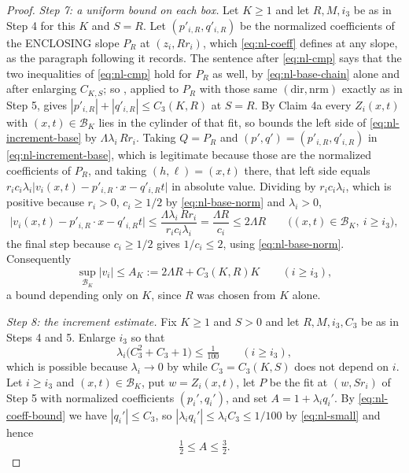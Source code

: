 \begin{proof}
\emph{Step 7: a uniform bound on each box.}
Let $K\ge1$ and let $R,M,i_3$ be as in Step 4 for this $K$ and $S=R$. Let
$(p'_{i,R},q'_{i,R})$ be the normalized coefficients of the ENCLOSING slope
$P_R$ at $(z_i,Rr_i)$, which \eqref{eq:nl-coeff} defines at any slope, as the
paragraph following it records. The sentence after \eqref{eq:nl-cmp} says that the
two inequalities of \eqref{eq:nl-cmp} hold for $P_R$ as well, by
\eqref{eq:nl-base-chain} alone and after enlarging $C_{K,S}$; so
, applied to $P_R$ with those same
$(\mathrm{dir},\mathrm{nrm})$ exactly as in Step 5, gives
$|p'_{i,R}|+|q'_{i,R}|\le C_3(K,R)$ at $S=R$. By
Claim 4a every $Z_i(x,t)$ with $(x,t)\in\mathcal B_K$ lies in the cylinder of
that fit, so  bounds the left side of
\eqref{eq:nl-increment-base} by $\Lambda\lambda_i\,Rr_i$. Taking
$Q=P_R$ and $(p',q')=(p'_{i,R},q'_{i,R})$ in \eqref{eq:nl-increment-base}, which is
legitimate because those are the normalized coefficients of $P_R$, and taking
$(h,\ell)=(x,t)$ there, that left side equals
$r_ic_i\lambda_i\bigl|v_i(x,t)-p'_{i,R}\cdot x-q'_{i,R}t\bigr|$ in absolute value.
Dividing by $r_ic_i\lambda_i$, which is positive because $r_i>0$, $c_i\ge1/2$ by
\eqref{eq:nl-base-norm} and $\lambda_i>0$,
\[
  \bigl|v_i(x,t)-p'_{i,R}\cdot x-q'_{i,R}t\bigr|
     \le\frac{\Lambda\lambda_i\,Rr_i}{r_ic_i\lambda_i}=\frac{\Lambda R}{c_i}
     \le2\Lambda R\qquad\bigl((x,t)\in\mathcal B_K,\ i\ge i_3\bigr),
\]
the final step because $c_i\ge1/2$ gives $1/c_i\le2$,
using \eqref{eq:nl-base-norm}. Consequently
\begin{equation}\label{eq:nl-bound}
  \sup_{\mathcal B_K}|v_i|\le A_K:=2\Lambda R+C_3(K,R)K\qquad(i\ge i_3),
\end{equation}
a bound depending only on $K$, since $R$ was chosen from $K$ alone.

\emph{Step 8: the increment estimate.}
Fix $K\ge1$ and $S>0$ and let $R,M,i_3,C_3$ be as in Steps 4 and 5. Enlarge
$i_3$ so that
\begin{equation}\label{eq:nl-small}
  \lambda_i\bigl(C_3^2+C_3+1\bigr)\le\tfrac1{100}\qquad(i\ge i_3),
\end{equation}
which is possible because $\lambda_i\to0$ by  while
$C_3=C_3(K,S)$ does not depend on $i$. Let $i\ge i_3$ and
$(x,t)\in\mathcal B_K$, put $w=Z_i(x,t)$, let $P$ be the fit at $(w,Sr_i)$ of
Step 5 with normalized coefficients $(p_i',q_i')$, and set $A=1+\lambda_iq_i'$.
By \eqref{eq:nl-coeff-bound} we have $|q_i'|\le C_3$, so
$|\lambda_iq_i'|\le\lambda_iC_3\le1/100$ by \eqref{eq:nl-small} and hence
\begin{equation}\label{eq:nl-A}
  \tfrac12\le A\le\tfrac32 .
\end{equation}


\end{proof}
